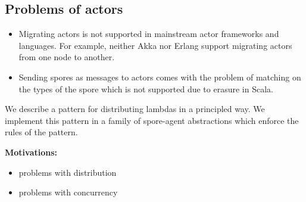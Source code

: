 \documentclass{llncs}
\begin{document}







\subsection{Problems of actors}

\begin{itemize}

\item Migrating actors is not supported in mainstream actor frameworks and
languages. For example, neither Akka nor Erlang support migrating actors from
one node to another.

\item Sending spores as messages to actors comes with the problem of matching
on the types of the spore which is not supported due to erasure in Scala.

\end{itemize}

We describe a pattern for distributing lambdas in a principled way. We
implement this pattern in a family of spore-agent abstractions which enforce
the rules of the pattern.

{\bf Motivations:}
\begin{itemize}
\item problems with distribution
\item problems with concurrency
\end{itemize}
\end{document}

